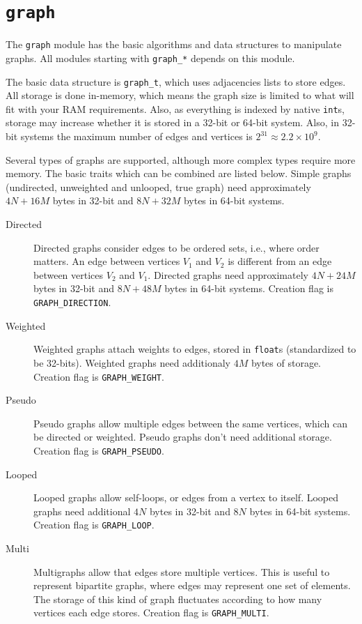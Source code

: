 \section{\texttt{graph}}

The \texttt{graph} module has the basic algorithms and data structures to manipulate graphs. All modules starting with \texttt{graph\_*} depends on this module.

The basic data structure is \texttt{graph\_t}, which uses adjacencies lists to store edges. All storage is done in-memory, which means the graph size is limited to 
what will fit with your RAM requirements. Also, as everything is indexed by native \texttt{int}s, storage may increase whether it is stored in a 32-bit or 64-bit system.
Also, in 32-bit systems the maximum number of edges and vertices is $2^{31} \approx 2.2 \times 10^9$.

Several types of graphs are supported, although more complex types require more memory. The basic traits which can be combined are listed below. Simple graphs 
(undirected, unweighted and unlooped, true graph) need approximately $4N+16M$ bytes in 32-bit and $8N + 32M$ bytes in 64-bit systems.

\begin{description}
 \item[Directed] Directed graphs consider edges to be ordered sets, i.e., where order matters. An edge between vertices $V_1$ and $V_2$ is different from an edge between
 vertices $V_2$ and $V_1$. Directed graphs need approximately $4N + 24M$ bytes in 32-bit and $8N + 48M$ bytes in 64-bit systems. 
  Creation flag is \texttt{GRAPH\_DIRECTION}.
 
 \item[Weighted] Weighted graphs attach weights to edges, stored in \texttt{float}s (standardized to be 32-bits). Weighted graphs need additionaly $4M$ bytes of storage.
 Creation flag is \texttt{GRAPH\_WEIGHT}.
 
 \item[Pseudo] Pseudo graphs allow multiple edges between the same vertices, which can be directed or weighted. Pseudo graphs don't need additional storage.
 Creation flag is \texttt{GRAPH\_PSEUDO}.
 
 \item[Looped] Looped graphs allow self-loops, or edges from a vertex to itself. Looped graphs need additional $4N$ bytes in 32-bit and $8N$ bytes in 64-bit systems.
 Creation flag is \texttt{GRAPH\_LOOP}.
 
 \item[Multi] Multigraphs allow that edges store multiple vertices. This is useful to represent bipartite graphs, where edges may represent one set of elements. 
 The storage of this kind of graph fluctuates according to how many vertices each edge stores. Creation flag is \texttt{GRAPH\_MULTI}.
\end{description}

